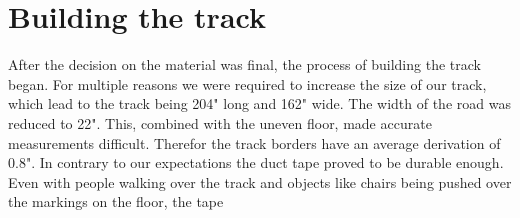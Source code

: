 \section{Building the track}
After the decision on the material was final,  the process of building the track began. For multiple reasons we were required to increase the size of our track, which lead to the track being 204" long and 162" wide. The width of the road was reduced to 22". This, combined with the uneven floor, made accurate measurements difficult. Therefor the track borders have an average derivation of 0.8". In contrary to our expectations the duct tape proved to be durable enough. Even with people walking over the track and objects like chairs being pushed over the markings on the floor, the tape 